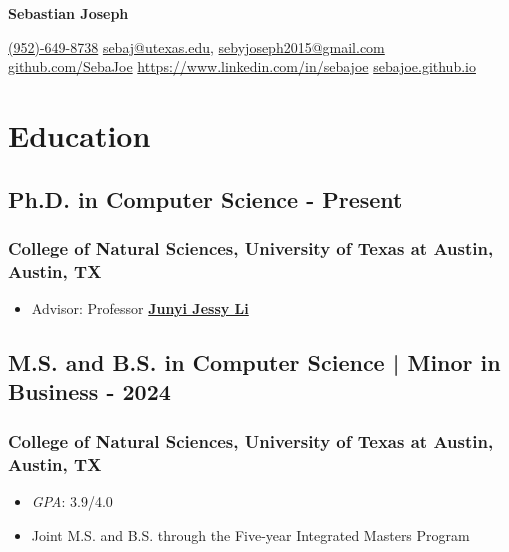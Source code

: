 \documentclass[11pt]{article}
\begin{document}
\begin{center}      
    {\fontsize{28}{28}\selectfont \textbf{Sebastian Joseph}} \\ \bigskip

    {\color{icnclr}} \href{tel:+19526498738}{(952)-649-8738} \quad
    {\color{icnclr}\faEnvelope[regular]} \href{mailto:sebaj@utexas.edu}{sebaj@utexas.edu}, \href{mailto:sebyjoseph2015@gmail.com}{sebyjoseph2015@gmail.com} \\
    {\color{icnclr}\faGithub} \href{https://www.github.com/SebaJoe}{github.com/SebaJoe} 
    \quad
    {\color{icnclr}\faLinkedinIn} \href{https://www.linkedin.com/in/sebajoe}{https://www.linkedin.com/in/sebajoe} \quad
    {\color{icnclr}} \href{https://sebajoe.github.io}{sebajoe.github.io} \quad
\end{center}

\section{Education}
\subsection{Ph.D. in Computer Science\hfill {} - Present}  

\subsubsection{College of Natural Sciences, University of Texas at Austin, Austin, TX}
\begin{itemize}
    \item Advisor: Professor \href{https://jessyli.com/}{\textbf{Junyi Jessy Li}}
    \end{itemize}
\subsection{M.S. and B.S. in Computer Science | Minor in Business \hfill {} - 2024}  

\subsubsection{College of Natural Sciences, University of Texas at Austin, Austin, TX}
\begin{itemize}
    \item \textit{GPA}: 3.9/4.0
    \item Joint M.S. and B.S. through the Five-year Integrated Masters Program
    \end{itemize}
    
\end{document}

